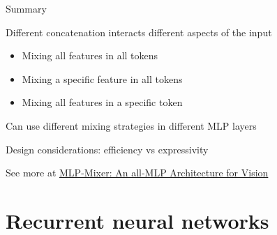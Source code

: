 \documentclass[usenames,dvipsnames,notes,11pt,aspectratio=169,hyperref={colorlinks=true, linkcolor=blue}]{beamer}
\begin{document}
\begin{frame}
    {Summary}
    \begin{wideitemize}
        \item Different concatenation interacts different aspects of the input
            \begin{itemize}
                \item Mixing all features in all tokens
                \item Mixing a specific feature in all tokens
                \item Mixing all features in a specific token 
            \end{itemize}
        \item Can use different mixing strategies in different MLP layers
        \item Design considerations: efficiency vs expressivity
        \item See more at \href{https://arxiv.org/abs/2105.01601}{MLP-Mixer: An all-MLP Architecture for Vision}
    \end{wideitemize}
\end{frame}

\section{Recurrent neural networks}
\end{document}
